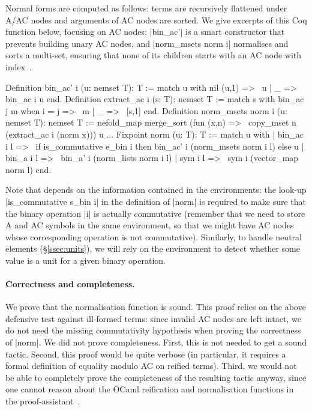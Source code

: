 \documentclass{llncs}
\begin{document}
Normal forms are computed as follows: terms are recursively flattened
under A/AC nodes and arguments of AC nodes are sorted.
We give excerpts of this Coq function below, focusing on AC nodes:
\coqinline|bin_ac'| is a smart constructor that prevents building
unary AC nodes, and \coqinline|norm_msets norm i| normalises and sorts a
multi-set, ensuring that none of its children starts with an AC node
with index~.

\begin{coq}
Definition bin_ac' i (u: nemset T): T := match u with nil (u,1) =>~ u  | _ =>~ bin_ac i u end.
Definition extract_ac i (s: T): nemset T := 
  match s with bin_ac j m when i = j =>~ m | _ =>~ [s,1] end. 
Definition norm_msets norm i (u: nemset T): nemset T := 
  nefold_map merge_sort (fun (x,n) =>~ copy_mset n (extract_ac i (norm x))) u
...
Fixpoint norm (u: T): T := match u with
| bin_ac i l =>~ if is_commutative e_bin i then bin_ac' i (norm_msets norm i l)  else u
| bin_a i l =>~ bin_a' i (norm_lists norm i l)
| sym i l =>~ sym i (vector_map norm l)
end.
\end{coq}

Note that  depends on the information contained in the
environments: the look-up 
\coqinline|is_commutative s_bin i| in the definition of
\coqinline|norm| is required to make sure that the binary operation
\coqinline|i| is actually commutative (remember that we need to store
A and AC symbols in the same environment, so that we might have AC
nodes whose corresponding operation is not commutative).  Similarly,
to handle neutral elements (\S\ref{ssec:units}), we will rely on the
environment to detect whether some value is a unit for a given binary
operation.

\paragraph{Correctness and completeness.}

We prove that the normalisation function is sound. This proof relies
on the above defensive test against ill-formed terms: since invalid AC
nodes are left intact, we do not need the missing commutativity
hypothesis when proving the correctness of \coqinline|norm|.
We did not prove completeness. First, this is not needed to get a
sound tactic. Second, this proof would be quite verbose (in
particular, it requires a formal definition of equality modulo AC on
reified terms). Third, we would not be able to completely prove the
completeness of the resulting tactic anyway, since one cannot reason
about the OCaml reification and normalisation functions in the
proof-assistant~\cite{gregoire-mahboubi-05,boutin-97}.
\end{document}
